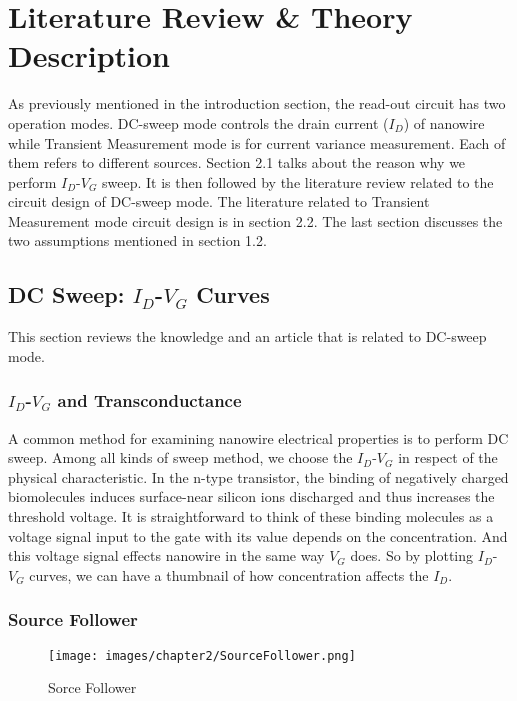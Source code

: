 \chapter{Literature Review \& Theory Description}
As previously mentioned in the introduction section, the read-out circuit has two operation modes.
DC-sweep mode controls the drain current ($I_D$) of nanowire while Transient Measurement mode is for current variance measurement.
Each of them refers to different sources.
Section 2.1 talks about the reason why we perform $I_D$-$V_G$ sweep.
It is then followed by the literature review related to the circuit design of DC-sweep mode.
The literature related to Transient Measurement mode circuit design is in section 2.2.
The last section discusses the two assumptions mentioned in section 1.2.

\section{DC Sweep: $I_D$-$V_G$ Curves}
This section reviews the knowledge and an article that is related to DC-sweep mode.

\subsection{$I_D$-$V_G$ and Transconductance}
A common method for examining nanowire electrical properties is to perform DC sweep.
Among all kinds of sweep method, we choose the $I_D$-$V_G$ in respect of the physical characteristic.
In the n-type transistor, the binding of negatively charged biomolecules induces surface-near silicon ions discharged and thus increases the threshold voltage.
It is straightforward to think of these binding molecules as a voltage signal input to the gate with its value depends on the concentration.
And this voltage signal effects nanowire in the same way $V_G$ does.
So by plotting $I_D$-$V_G$ curves, we can have a thumbnail of how concentration affects the $I_D$.

\subsection{Source Follower} \label{section:SF}

\begin{figure}[h]
    \centering
    \texttt{[image: images/chapter2/SourceFollower.png]}
    \fontsize{6}{7}\selectfont
    \caption{Sorce Follower}
    \label{fig:SF}
\end{figure}

